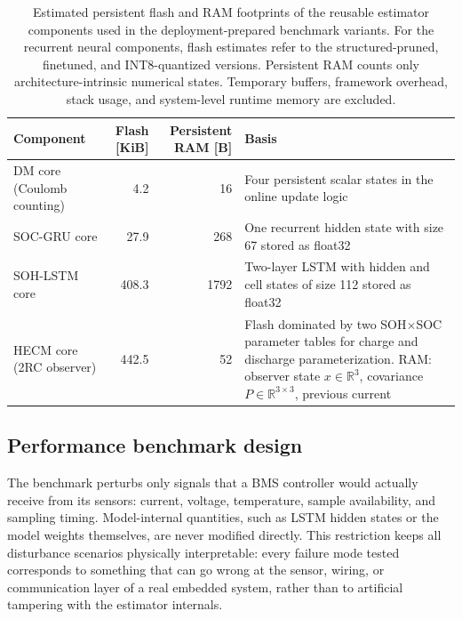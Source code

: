 \documentclass[
    a4paper,
    12pt,
    titlepage,
    bibliography=totoc,
    twoside=on,
    parskip=false,
    numbers=noenddot,
    cleardoublepage=empty,
    DIV=12,
    BCOR=12.0mm,
    headheight=36pt,
    headings=openright
]{scrreprt}
\begin{document}
\begin{table}[H]
    \centering
    \small
    \caption[Reusable estimator-component footprints.]{Estimated persistent flash and RAM footprints of the reusable estimator components used in the deployment-prepared benchmark variants. For the recurrent neural components, flash estimates refer to the structured-pruned, finetuned, and INT8-quantized versions. Persistent RAM counts only architecture-intrinsic numerical states. Temporary buffers, framework overhead, stack usage, and system-level runtime memory are excluded.}
    \label{tab:robust_component_footprints}
    \begin{tabularx}{\textwidth}{>{\raggedright\arraybackslash}p{3.4cm}rr>{\raggedright\arraybackslash}X}
        \toprule
        Component & Flash [KiB] & Persistent RAM [B] & Basis \\
        \midrule
        DM core (Coulomb counting) & 4.2 & 16 & Four persistent scalar states in the online update logic \\
        SOC-GRU core & 27.9 & 268 & One recurrent hidden state with size 67 stored as float32 \\
        SOH-LSTM core & 408.3 & 1792 & Two-layer LSTM with hidden and cell states of size 112 stored as float32 \\
        HECM core (2RC observer) & 442.5 & 52 & Flash dominated by two SOH$\times$SOC parameter tables for charge and discharge parameterization. RAM: observer state $x \in \mathbb{R}^{3}$, covariance $P \in \mathbb{R}^{3 \times 3}$, previous current \\
        \bottomrule
    \end{tabularx}
\end{table}

\subsection{Performance benchmark design}
The benchmark perturbs only signals that a BMS controller would actually receive from its sensors: current, voltage, temperature, sample availability, and sampling timing. Model-internal quantities, such as LSTM hidden states or the model weights themselves, are never modified directly. This restriction keeps all disturbance scenarios physically interpretable: every failure mode tested corresponds to something that can go wrong at the sensor, wiring, or communication layer of a real embedded system, rather than to artificial tampering with the estimator internals.\autocite{bergerBenchmarkingBatteryManagement2024}
\end{document}
